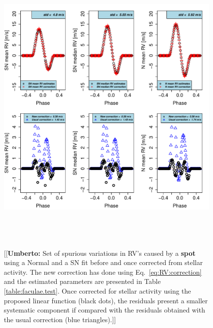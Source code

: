 \documentclass{aa}
\newcommand{\umberto}[1]{{\color{green}[[\textbf{Umberto: }#1]]}}
\begin{document}
\begin{figure}[htbp]
\begin{center}
\includegraphics[height = 6in]{Spot_NEW_CORRECTION_[3]CorrectionActivity_RadialVelocity_vs_time.pdf} 
   \caption{\umberto{Set of  spurious variations in RV's caused by a \textbf{spot} using a Normal and a SN fit before and once corrected from stellar activity. The new correction has done using Eq.~\ref{eq:RV:correction} and the estimated parameters are presented in Table \ref{table:faculae.test}. Once corrected for stellar activity using the proposed linear function (black dots), the residuals present a smaller systematic component if compared with the residuals obtained with the usual correction (blue triangles).}}
    \label{fig:spot.correction}
\end{center}
\end{figure}
\end{document}
